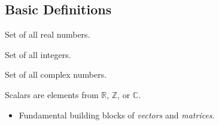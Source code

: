 \documentclass[../../main.tex]{subfiles}
\begin{document}


    \subsection{Basic Definitions}

     {
        Set of all real numbers. 
    }
    
     {
        Set of all integers. 
    }
    
     {
        Set of all complex numbers. 
    }
    
     {
        Scalars are elements from $\mathbb{R}$, $\mathbb{Z}$, or $\mathbb{C}$.
        \begin{itemize}
            \item Fundamental building blocks of \textit{vectors} and \textit{matrices}.
        \end{itemize}
    }
    
    
\end{document}

